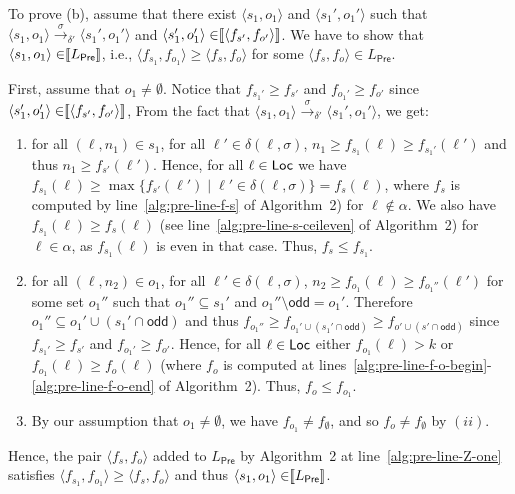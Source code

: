 \documentclass{LMCS}
\def\sg{\mathrel[\joinrel\mathrel[}
\def\sd{\mathrel]\joinrel\mathrel]}
\newcommand{\Pre}{\mathsf{Pre}}
\newcommand{\sem}[1]{\sg \mathrel{#1} \sd}
\renewcommand{\l}{{\ell}}
\newcommand{\Loc}{{\sf Loc}}
\newcommand{\tuple}[1]{\langle #1 \rangle}
\newcommand{\odd}{\mathsf{odd}}
\begin{document}
To prove (b), assume that there exist $\tuple{s_1,o_1}$ and $\tuple{s_1',o_1'}$
such that $\tuple{s_1,o_1} \xrightarrow{\sigma}_{\delta'} \tuple{s_1',o_1'}$ and 
$\tuple{s_1',o_1'} \in \sem{\tuple{f_{s'},f_{o'}}}$.
We have to show that $\tuple{s_1,o_1} \in \sem{L_{\Pre}}$, i.e., 
$\tuple{f_{s_1},f_{o_1}} \geq \tuple{f_s,f_o}$ for some $\tuple{f_s,f_o} \in L_{\Pre}$.

First, assume that $o_1 \neq \emptyset$. 
Notice that $f_{s_1'} \geq f_{s'}$ and $f_{o_1'} \geq f_{o'}$ 
since $\tuple{s_1',o_1'} \in \sem{\tuple{f_{s'},f_{o'}}}$,
From the fact that $\tuple{s_1,o_1} \xrightarrow{\sigma}_{\delta'} \tuple{s_1',o_1'}$,
we get:
\begin{enumerate}[$(i)$] 
\item for all $(\l,n_1) \in s_1$, for all $\l' \in \delta(\l,\sigma)$, $n_1 \geq f_{s_1}(\l) \geq f_{s_1'}(\l')$ 
and thus $n_1 \geq f_{s'}(\l')$. Hence, for all $\l \in \Loc$ we have
$f_{s_1}(\l) \geq \max\{f_{s'}(\l') \mid \l' \in \delta(\l,\sigma)\} = f_s(\l)$,
where $f_s$ is computed by line~\ref{alg:pre-line-f-s} of Algorithm~2) for $\l \not\in \alpha$. 
We also have $f_{s_1}(\l) \geq f_s(\l)$ (see line~\ref{alg:pre-line-s-ceileven} of Algorithm~2) 
for $\l \in \alpha$, as $f_{s_1}(\l)$ is even in that case.
Thus, $f_s \leq f_{s_1}$.
 
\item for all $(\l,n_2) \in o_1$, for all $\l' \in \delta(\l,\sigma)$, $n_2 \geq f_{o_1}(\l) \geq f_{o_1''}(\l')$ 
for some set $o_1''$ such that $o_1'' \subseteq s_1'$ and $o_1'' \setminus \odd = o_1'$. 
Therefore $o_1'' \subseteq o_1' \cup (s_1' \cap \odd)$
and thus $f_{o_1''} \geq f_{o_1' \cup (s_1' \cap \odd)} \geq f_{o' \cup (s' \cap \odd)}$
since $f_{s_1'} \geq f_{s'}$ and $f_{o_1'} \geq f_{o'}$.
Hence, for all $\l \in \Loc$ 
either $f_{o_1}(\l) > k$ or $f_{o_1}(\l) \geq f_o(\l)$ (where $f_o$ is computed 
at lines~\ref{alg:pre-line-f-o-begin}-\ref{alg:pre-line-f-o-end} of Algorithm~2).
Thus, $f_o \leq f_{o_1}$.

\item By our assumption that $o_1 \neq \emptyset$, we have $f_{o_1} \neq f_{\emptyset}$, and 
so $f_{o} \neq f_{\emptyset}$ by $(ii)$.
\end{enumerate}\medskip

\noindent Hence, the pair $\tuple{f_s,f_o}$ added to $L_{\Pre}$ by
Algorithm~2 at line~\ref{alg:pre-line-Z-one} satisfies
$\tuple{f_{s_1},f_{o_1}} \geq \tuple{f_s,f_o}$ and thus
$\tuple{s_1,o_1} \in \sem{L_{\Pre}}$.
\end{document}
